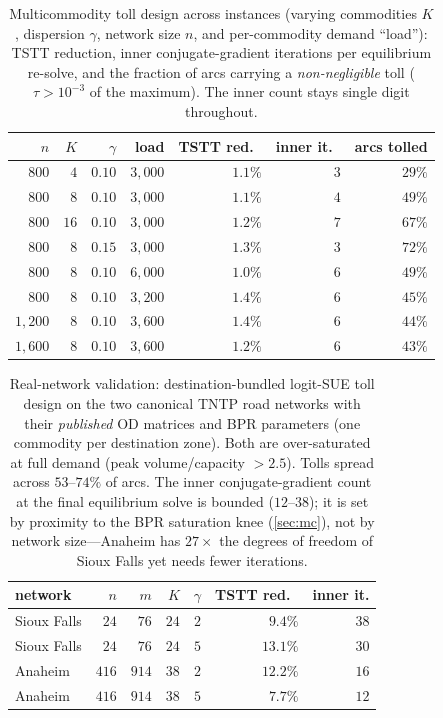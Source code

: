 \documentclass[ijoc]{informs3}
\begin{document}
\begin{table}[t]\centering
\caption{Multicommodity toll design across instances (varying commodities $K$, dispersion $\gamma$, network
size $n$, and per-commodity demand ``load''): TSTT reduction, inner conjugate-gradient iterations per
equilibrium re-solve, and the fraction of arcs carrying a \emph{non-negligible} toll ($\tau>10^{-3}$ of the
maximum). The inner count stays single digit throughout.}
\label{tab:mcdesign}
\begin{tabular}{rrrrrrr}\toprule
$n$ & $K$ & $\gamma$ & load & TSTT red.\ & inner it.\ & arcs tolled\\\midrule
$800$     & $4$  & $0.10$ & $3{,}000$ & $1.1\%$ & $3$ & $29\%$\\
$800$     & $8$  & $0.10$ & $3{,}000$ & $1.1\%$ & $4$ & $49\%$\\
$800$     & $16$ & $0.10$ & $3{,}000$ & $1.2\%$ & $7$ & $67\%$\\
$800$     & $8$  & $0.15$ & $3{,}000$ & $1.3\%$ & $3$ & $72\%$\\
$800$     & $8$  & $0.10$ & $6{,}000$ & $1.0\%$ & $6$ & $49\%$\\
$800$     & $8$  & $0.10$ & $3{,}200$ & $1.4\%$ & $6$ & $45\%$\\
$1{,}200$ & $8$  & $0.10$ & $3{,}600$ & $1.4\%$ & $6$ & $44\%$\\
$1{,}600$ & $8$  & $0.10$ & $3{,}600$ & $1.2\%$ & $6$ & $43\%$\\\bottomrule
\end{tabular}
\end{table}

\begin{table}[t]\centering
\caption{Real-network validation: destination-bundled logit-SUE toll design on the two canonical TNTP road
networks with their \emph{published} OD matrices and BPR parameters (one commodity per destination zone). Both
are over-saturated at full demand (peak volume/capacity $>2.5$). Tolls spread across $53$--$74\%$ of arcs. The
inner conjugate-gradient count at the final equilibrium solve is bounded ($12$--$38$); it is set by proximity
to the BPR saturation knee (\cref{sec:mc}), not by network size---Anaheim has $27\times$ the degrees of freedom
of Sioux Falls yet needs fewer iterations.}
\label{tab:mcreal}
\begin{tabular}{lrrrrrr}\toprule
network & $n$ & $m$ & $K$ & $\gamma$ & TSTT red.\ & inner it.\\\midrule
Sioux Falls & $24$  & $76$  & $24$ & $2$ & $9.4\%$  & $38$\\
Sioux Falls & $24$  & $76$  & $24$ & $5$ & $13.1\%$ & $30$\\
Anaheim     & $416$ & $914$ & $38$ & $2$ & $12.2\%$ & $16$\\
Anaheim     & $416$ & $914$ & $38$ & $5$ & $\phantom{0}7.7\%$  & $12$\\\bottomrule
\end{tabular}
\end{table}
\end{document}
